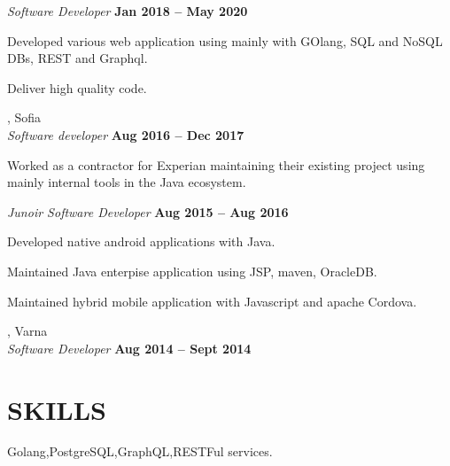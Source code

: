 \documentclass[margin,line]{resume}
\begin{document}
\begin{resume}
    \textsl{Software Developer} \hfill \textbf{Jan 2018 {--} May 2020}\\
    \begin{list2}
        \item Developed various web application using mainly with
          GOlang, SQL and NoSQL DBs, REST and Graphql.
	\item Deliver high quality code.\@
    \end{list2}

    \textbf{}, Sofia \vspace{2mm}\\\vspace{1mm}%
    \textsl{Software developer} \hfill \textbf{Aug 2016 {--} Dec 2017}\\
    \begin{list2}
        \item Worked as a contractor for Experian maintaining their
          existing project using mainly internal tools in the Java
          ecosystem.
    \end{list2}

    \textsl{Junoir Software Developer} \hfill \textbf{Aug 2015 {--} Aug 2016}\\
    \begin{list2}
        \item Developed native android applications with Java.
	\item Maintained Java enterpise application using JSP, maven, OracleDB.\@
        \item Maintained hybrid mobile application with Javascript and apache Cordova.
    \end{list2}

    \textbf{}, Varna \vspace{2mm}\\\vspace{1mm}%
    \textsl{Software Developer} \hfill \textbf{Aug 2014 {--} Sept 2014}


\sectionline%

    \section{\mysidestyle\textbf{\large{S}\small{KILLS}}}

    Golang,\hspace{2mm}PostgreSQL,\hspace{2mm}GraphQL,\hspace{2mm}RESTFul services.


\end{resume}
\end{document}
